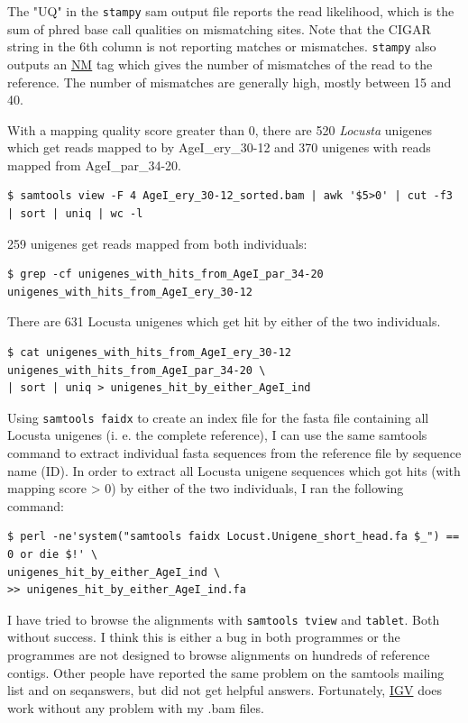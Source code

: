 \documentclass{article}\usepackage[]{graphicx}\usepackage[]{color}
\begin{document}
The "UQ" in the \texttt{stampy} sam output file reports the read likelihood, which is the sum of phred base call qualities on mismatching sites. Note that the CIGAR string in the 6th column is not reporting matches or mismatches. \texttt{stampy} also outputs an \href{http://samtools.sourceforge.net/SAMv1.pdf}{NM} tag which gives the number of mismatches of the read to the reference. The number of mismatches are generally high, mostly between 15 and 40.

With a mapping quality score greater than 0, there are 520 \textit{Locusta} unigenes which get reads mapped to by AgeI\_ery\_30-12 and 370 unigenes with reads mapped from AgeI\_par\_34-20. 

\begin{Verbatim}
$ samtools view -F 4 AgeI_ery_30-12_sorted.bam | awk '$5>0' | cut -f3 | sort | uniq | wc -l
\end{Verbatim}

259 unigenes get reads mapped from both individuals:

\begin{Verbatim}
$ grep -cf unigenes_with_hits_from_AgeI_par_34-20 unigenes_with_hits_from_AgeI_ery_30-12
\end{Verbatim}

There are 631 Locusta unigenes which get hit by either of the two individuals.
\begin{Verbatim}
$ cat unigenes_with_hits_from_AgeI_ery_30-12 unigenes_with_hits_from_AgeI_par_34-20 \
| sort | uniq > unigenes_hit_by_either_AgeI_ind
\end{Verbatim}

Using \texttt{samtools faidx} to create an index file for the fasta file containing all Locusta unigenes (i. e. the complete reference), I can use the same samtools command to extract individual fasta sequences from the reference file by sequence name (ID). In order to extract all Locusta unigene sequences which got hits (with mapping score > 0) by either of the two individuals, I ran the following command:
\begin{Verbatim}
$ perl -ne'system("samtools faidx Locust.Unigene_short_head.fa $_") == 0 or die $!' \
unigenes_hit_by_either_AgeI_ind \
>> unigenes_hit_by_either_AgeI_ind.fa
\end{Verbatim}

\label{alignment_viewer} I have tried to browse the alignments with \texttt{samtools tview} and \texttt{tablet}. Both without success. I think this is either a bug in both programmes or the programmes are not designed to browse alignments on hundreds of reference contigs. Other people have reported the same problem on the samtools mailing list and on seqanswers, but did not get helpful answers. Fortunately, \href{http://www.broadinstitute.org/software/igv/home}{IGV} does work without any problem with my .bam files.
\end{document}
